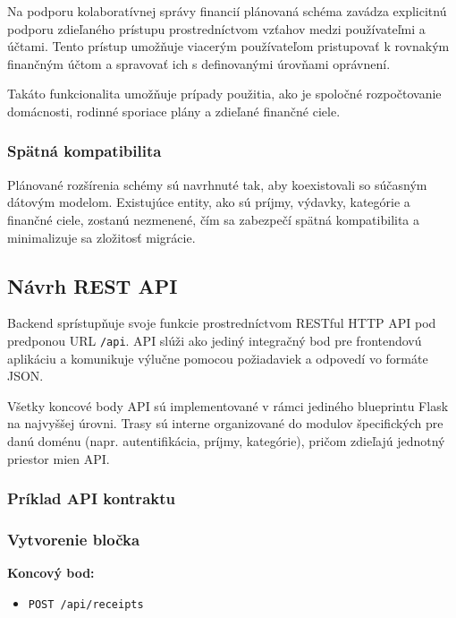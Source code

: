 Na podporu kolaboratívnej správy financií plánovaná schéma zavádza explicitnú podporu zdieľaného prístupu prostredníctvom vzťahov medzi používateľmi a účtami. Tento prístup umožňuje viacerým používateľom pristupovať k rovnakým finančným účtom a spravovať ich s definovanými úrovňami oprávnení.

Takáto funkcionalita umožňuje prípady použitia, ako je spoločné rozpočtovanie domácnosti, rodinné sporiace plány a zdieľané finančné ciele.

\subsubsection{Spätná kompatibilita}

Plánované rozšírenia schémy sú navrhnuté tak, aby koexistovali so súčasným dátovým modelom. Existujúce entity, ako sú príjmy, výdavky, kategórie a finančné ciele, zostanú nezmenené, čím sa zabezpečí spätná kompatibilita a minimalizuje sa zložitosť migrácie.


\subsection{Návrh REST API}

Backend sprístupňuje svoje funkcie prostredníctvom RESTful HTTP API pod predponou URL \texttt{/api}. API slúži ako jediný integračný bod pre frontendovú aplikáciu a komunikuje výlučne pomocou požiadaviek a odpovedí vo formáte JSON.

Všetky koncové body API sú implementované v rámci jediného blueprintu Flask na najvyššej úrovni. Trasy sú interne organizované do modulov špecifických pre danú doménu (napr. autentifikácia, príjmy, kategórie), pričom zdieľajú jednotný priestor mien API. 

\subsubsection{Príklad API kontraktu}

\subsubsection*{Vytvorenie bločka}

\textbf{Koncový bod:}
\begin{itemize}
    \item \texttt{POST /api/receipts}
\end{itemize}

